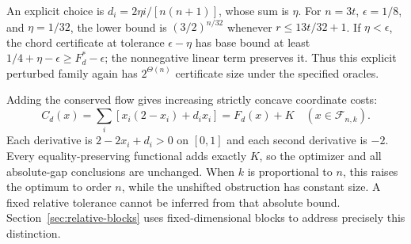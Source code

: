 An explicit choice is $d_i=2\eta i/[n(n+1)]$, whose sum is $\eta$.
For $n=3t$, $\epsilon=1/8$, and $\eta=1/32$, the lower bound is
$(3/2)^{n/32}$ whenever $r\le13t/32+1$.
If $\eta<\epsilon$, the chord certificate at tolerance
$\epsilon-\eta$ has base bound at least
$1/4+\eta-\epsilon\ge F_d^*-\epsilon$; the nonnegative linear term
preserves it. Thus this explicit perturbed family again has
$2^{\Theta(n)}$ certificate size under the specified oracles.

Adding the conserved flow gives increasing strictly concave coordinate
costs:
\begin{equation}\label{eq:increasing-allocation}
 C_d(x)=\sum_i[x_i(2-x_i)+d_ix_i]=F_d(x)+K
 \quad(x\in\mathcal F_{n,k}).
\end{equation}
Each derivative is $2-2x_i+d_i>0$ on $[0,1]$ and each second derivative
is $-2$. Every equality-preserving functional adds exactly $K$, so the
optimizer and all absolute-gap conclusions are unchanged. When $k$ is
proportional to $n$, this raises the optimum to order $n$, while the
unshifted obstruction has constant size. A fixed relative tolerance
cannot be inferred from that absolute bound. Section~\ref{sec:relative-blocks}
uses fixed-dimensional blocks to address precisely this distinction.
